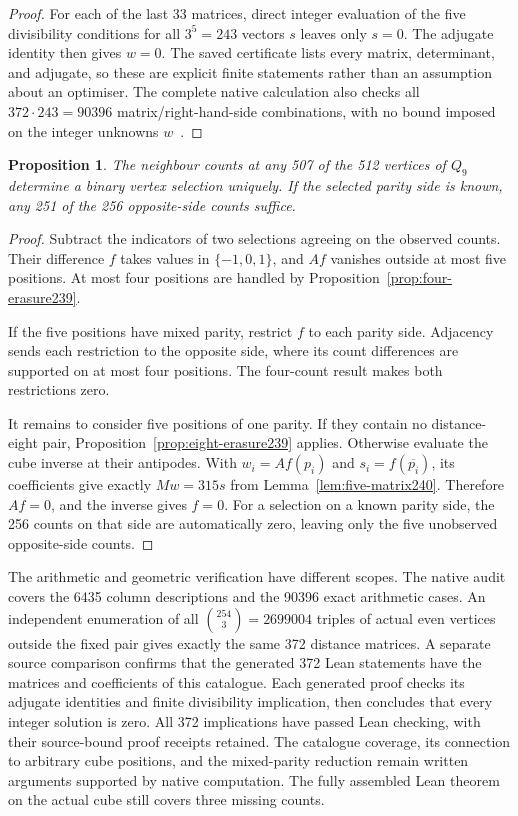 \documentclass[11pt,a4paper]{article}
\newtheorem{proposition}[theorem]{Proposition}
\theoremstyle{definition}
\theoremstyle{remark}
\begin{document}
\begin{proof}
For each of the last 33 matrices, direct integer evaluation of the
five divisibility conditions for all $3^5=243$ vectors $s$ leaves only
$s=0$. The adjugate identity then gives $w=0$. The saved certificate
lists every matrix, determinant, and adjugate, so these are explicit
finite statements rather than an assumption about an optimiser.
The complete native calculation also checks all
$372\cdot243=90396$ matrix/right-hand-side combinations, with no bound
imposed on the integer unknowns $w$~\cite{research240}.
\end{proof}

\begin{proposition}\label{prop:five-erasure240}
The neighbour counts at any 507 of the 512 vertices of $Q_9$ determine
a binary vertex selection uniquely. If the selected parity side is
known, any 251 of the 256 opposite-side counts suffice.
\end{proposition}
\begin{proof}
Subtract the indicators of two selections agreeing on the observed
counts. Their difference $f$ takes values in $\{-1,0,1\}$, and $Af$
vanishes outside at most five positions. At most four positions are
handled by Proposition~\ref{prop:four-erasure239}.

If the five positions have mixed parity, restrict $f$ to each parity
side. Adjacency sends each restriction to the opposite side, where
its count differences are supported on at most four positions.
The four-count result makes both restrictions zero.

It remains to consider five positions of one parity. If they contain
no distance-eight pair, Proposition~\ref{prop:eight-erasure239} applies.
Otherwise evaluate the cube inverse at their antipodes. With
$w_i=Af(p_i)$ and $s_i=f(\overline{p_i})$, its coefficients give exactly
$Mw=315s$ from Lemma~\ref{lem:five-matrix240}. Therefore $Af=0$, and the
inverse gives $f=0$. For a selection on a known parity side, the 256
counts on that side are automatically zero, leaving only the five
unobserved opposite-side counts.
\end{proof}

The arithmetic and geometric verification have different scopes.
The native audit covers the 6435 column descriptions and the 90396
exact arithmetic cases. An independent enumeration of all
$\binom{254}{3}=2699004$ triples of actual even vertices outside the
fixed pair gives exactly the same 372 distance matrices. A separate source comparison confirms that
the generated 372 Lean statements have the matrices and coefficients
of this catalogue. Each generated proof checks its adjugate identities
and finite divisibility implication, then concludes that every integer
solution is zero. All 372 implications have passed Lean checking, with their
source-bound proof receipts retained. The catalogue coverage, its connection to arbitrary cube
positions, and the mixed-parity reduction remain written arguments
supported by native computation. The fully assembled Lean theorem on
the actual cube still covers three missing counts.
\end{document}
